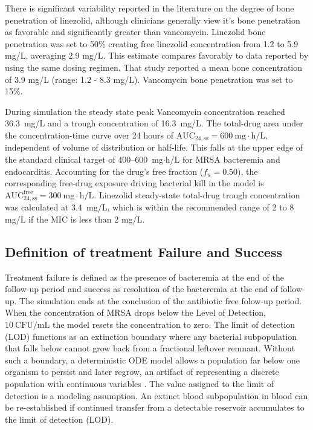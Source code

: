 \documentclass[12pt, draftcls, onecolumn]{IEEEtran}
\begin{document}
There is significant variability reported in the literature on the degree of bone penetration of linezolid,
although clinicians generally view it's bone penetration as favorable and significantly greater than vancomycin.
Linezolid bone penetration was set to 50\% creating free linezolid concentration from 1.2 to 5.9 mg/L, averaging 2.9 mg/L.
This estimate compares favorably
to data reported by \cite{kutschalissberg2003linezolid} using the same dosing regimen.  That study reported a mean bone
concentration of 3.9 mg/L (range: 1.2 - 8.3 mg/L).
Vancomycin bone penetration was set to 15\%.


During simulation the steady state peak Vancomycin concentration reached 36.3~mg/L and a trough concentration of 16.3~mg/L.  The total-drug
area under the concentration-time curve over 24 hours of
$\mathrm{AUC}_{24,\mathrm{ss}} = 600~\mathrm{mg\cdot h/L}$,
independent of volume of distribution or half-life. This falls at the upper
edge of the standard clinical target of 400--600~mg$\cdot$h/L for MRSA
bacteremia and endocarditis\cite{rybak2020therapeutic}. Accounting for the drug's free fraction
($f_u = 0.50$), the corresponding free-drug exposure driving bacterial kill
in the model is $\mathrm{AUC}_{24,\mathrm{ss}}^{\text{free}} = 300~\mathrm{mg\cdot h/L}$.
Linezolid steady-state total-drug trough concentration was calculated at 3.4~mg/L,
which is within the recommended range of 2 to 8 mg/L if the MIC is less than 2 mg/L\cite{alsultan2019determining}. 


\subsection{Definition of treatment Failure and Success}

Treatment failure is defined as the presence of bacteremia at the end of the follow-up period and success as resolution of the bacteremia at the end of follow-up.  The simulation ends at the conclusion of the antibiotic free folow-up period.  When the concentration of MRSA drops below the Level of Detection, $10~\mathrm{CFU/mL}$ the model resets the concentration to zero.  The limit of detection (LOD) functions as an extinction boundary where any bacterial subpopulation that falls below cannot grow back from a fractional leftover remnant. Without such a boundary, a deterministic ODE model allows a population far below one organism to persist and later regrow, an artifact of representing a discrete population with continuous variables \cite{Mollison1991,CampilloLobry2012}. The value assigned to the limit of detection is a modeling assumption.  An extinct blood subpopulation in blood can be re-established if continued transfer from a detectable reservoir accumulates to the limit of detection (LOD).
\end{document}

